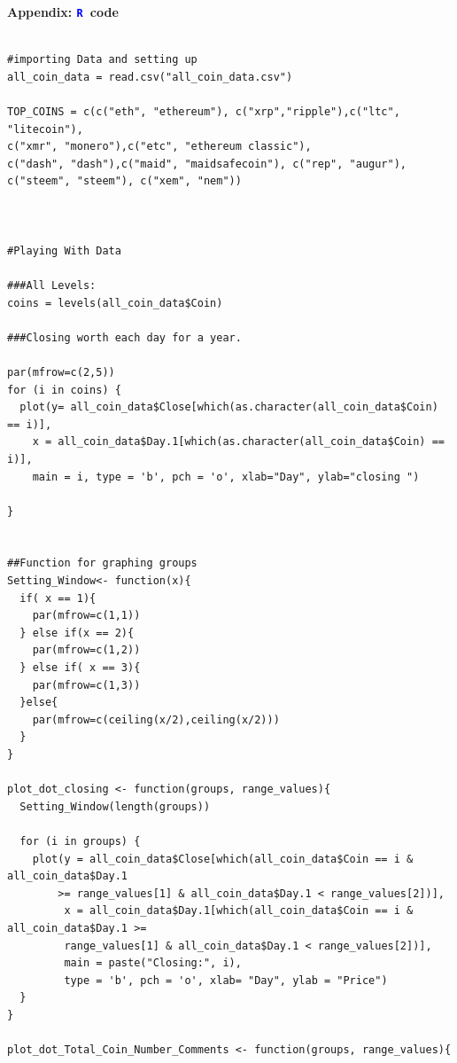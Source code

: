 \documentclass[12pt]{article}
\newcommand{\textR}[1]{\textcolor{blue}{\texttt{#1}}}
\newcommand{\R}{\textR{R}}
\begin{document}
\newpage

\appendix
\sloppy
\begin{center}
\sloppy

{\Large {\bf Appendix: \R\ code}}
\end{center}

{\footnotesize 

\begin{verbatim} 

#importing Data and setting up
all_coin_data = read.csv("all_coin_data.csv")

TOP_COINS = c(c("eth", "ethereum"), c("xrp","ripple"),c("ltc", "litecoin"),
c("xmr", "monero"),c("etc", "ethereum classic"),
c("dash", "dash"),c("maid", "maidsafecoin"), c("rep", "augur"), 
c("steem", "steem"), c("xem", "nem"))



#Playing With Data

###All Levels:
coins = levels(all_coin_data$Coin)

###Closing worth each day for a year.

par(mfrow=c(2,5))
for (i in coins) {
  plot(y= all_coin_data$Close[which(as.character(all_coin_data$Coin) == i)], 
  	x = all_coin_data$Day.1[which(as.character(all_coin_data$Coin) == i)], 
	main = i, type = 'b', pch = 'o', xlab="Day", ylab="closing ")
  
}


##Function for graphing groups
Setting_Window<- function(x){
  if( x == 1){
    par(mfrow=c(1,1))
  } else if(x == 2){
    par(mfrow=c(1,2))
  } else if( x == 3){
    par(mfrow=c(1,3))
  }else{
    par(mfrow=c(ceiling(x/2),ceiling(x/2)))
  }
}

plot_dot_closing <- function(groups, range_values){
  Setting_Window(length(groups))
  
  for (i in groups) {
    plot(y = all_coin_data$Close[which(all_coin_data$Coin == i & all_coin_data$Day.1 
    	>= range_values[1] & all_coin_data$Day.1 < range_values[2])], 
         x = all_coin_data$Day.1[which(all_coin_data$Coin == i & all_coin_data$Day.1 >=
         range_values[1] & all_coin_data$Day.1 < range_values[2])], 
         main = paste("Closing:", i), 
         type = 'b', pch = 'o', xlab= "Day", ylab = "Price")
  }
}

plot_dot_Total_Coin_Number_Comments <- function(groups, range_values){
  

\end{verbatim}}
\end{document}
